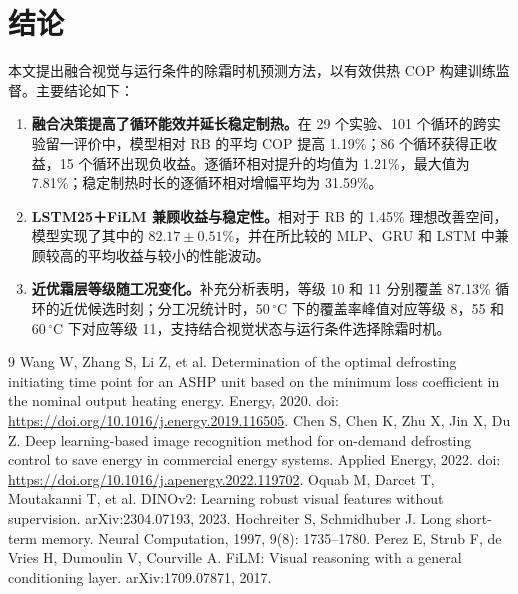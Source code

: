 \documentclass[UTF8,11pt,a4paper,fontset=fandol]{ctexart}
\begin{document}
\section{结论}
本文提出融合视觉与运行条件的除霜时机预测方法，以有效供热 COP 构建训练监督。主要结论如下：
\begin{enumerate}
\item \textbf{融合决策提高了循环能效并延长稳定制热。}在 29 个实验、101 个循环的跨实验留一评价中，模型相对 RB 的平均 COP 提高 1.19\%；86 个循环获得正收益，15 个循环出现负收益。逐循环相对提升的均值为 1.21\%，最大值为 7.81\%；稳定制热时长的逐循环相对增幅平均为 31.59\%。
\item \textbf{LSTM25＋FiLM 兼顾收益与稳定性。}相对于 RB 的 1.45\% 理想改善空间，模型实现了其中的 $82.17\pm0.51$\%，并在所比较的 MLP、GRU 和 LSTM 中兼顾较高的平均收益与较小的性能波动。
\item \textbf{近优霜层等级随工况变化。}补充分析表明，等级 10 和 11 分别覆盖 87.13\% 循环的近优候选时刻；分工况统计时，50\,$^\circ$C 下的覆盖率峰值对应等级 8，55 和 60\,$^\circ$C 下对应等级 11，支持结合视觉状态与运行条件选择除霜时机。
\end{enumerate}

\begin{thebibliography}{9}
\small
{} Wang W, Zhang S, Li Z, et al. Determination of the optimal defrosting initiating time point for an ASHP unit based on the minimum loss coefficient in the nominal output heating energy. Energy, 2020. doi: \url{https://doi.org/10.1016/j.energy.2019.116505}.
 Chen S, Chen K, Zhu X, Jin X, Du Z. Deep learning-based image recognition method for on-demand defrosting control to save energy in commercial energy systems. Applied Energy, 2022. doi: \url{https://doi.org/10.1016/j.apenergy.2022.119702}.
 Oquab M, Darcet T, Moutakanni T, et al. DINOv2: Learning robust visual features without supervision. arXiv:2304.07193, 2023.
 Hochreiter S, Schmidhuber J. Long short-term memory. Neural Computation, 1997, 9(8): 1735--1780.
 Perez E, Strub F, de Vries H, Dumoulin V, Courville A. FiLM: Visual reasoning with a general conditioning layer. arXiv:1709.07871, 2017.
\end{thebibliography}

\clearpage
\appendix
{}
\renewcommand{\thefigure}{\Alph{section}\arabic{figure}}
\renewcommand{\thetable}{\Alph{section}\arabic{table}}
\renewcommand{\theequation}{\Alph{section}\arabic{equation}}
\end{document}
